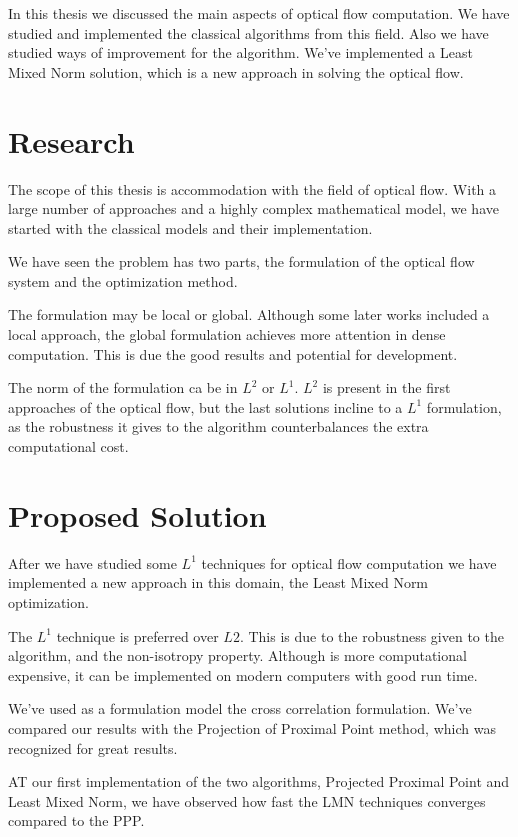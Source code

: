 \documentclass[12pt,a4paper,twoside]{report}
\begin{document}
{In this thesis we discussed the main aspects of optical flow computation. We have studied and implemented the classical algorithms from this field. Also we have studied ways of improvement for the algorithm. We've implemented a Least Mixed Norm solution, which is a new approach in solving the optical flow.


\section{Research}
The scope of this thesis is accommodation with the field of optical flow. With a large number of approaches and a highly complex mathematical model, we have started with the classical models and their implementation. 

We have seen the problem has two parts, the formulation of the optical flow system and the optimization method.

The formulation may be local or global. Although some later works included a local approach, the global formulation achieves more attention in dense computation. This is due the good results and potential for development.

The norm of the formulation ca be in $L^2$ or $L^1$. $L^2$ is present in the first approaches of the optical flow, but the last solutions incline to a $L^1$ formulation, as the robustness it gives to the algorithm counterbalances the extra computational cost.

\section{Proposed Solution}

After we have studied some $L^1$ techniques for optical flow computation we have implemented a new approach in this domain, the Least Mixed Norm optimization.

The $L^1$ technique is preferred over $L2$. This is due to the robustness given to the algorithm, and the non-isotropy property. Although is more computational expensive, it can be implemented on modern computers with good run time.  

 We've used as a formulation model the cross correlation formulation. We've compared our results with the Projection of Proximal Point method, which was recognized for great results.
 
 AT our first implementation of the two algorithms, Projected Proximal Point and Least Mixed Norm, we have observed how fast the LMN techniques converges compared to the PPP.
 
}
\end{document}
